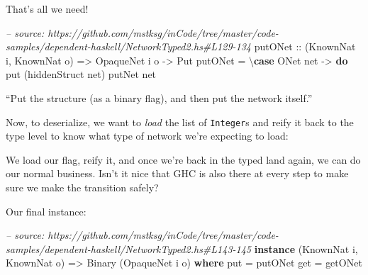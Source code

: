 \documentclass[]{article}
\newenvironment{Shaded}{}{}
\newcommand{\KeywordTok}[1]{\textcolor[rgb]{0.00,0.44,0.13}{\textbf{{#1}}}}
\newcommand{\DataTypeTok}[1]{\textcolor[rgb]{0.56,0.13,0.00}{{#1}}}
\newcommand{\CommentTok}[1]{\textcolor[rgb]{0.38,0.63,0.69}{\textit{{#1}}}}
\newcommand{\OtherTok}[1]{\textcolor[rgb]{0.00,0.44,0.13}{{#1}}}
\newcommand{\FunctionTok}[1]{\textcolor[rgb]{0.02,0.16,0.49}{{#1}}}
\newcommand{\NormalTok}[1]{{#1}}
\begin{document}
That's all we need!

\begin{Shaded}
\begin{Highlighting}[]
\CommentTok{-- source: https://github.com/mstksg/inCode/tree/master/code-samples/dependent-haskell/NetworkTyped2.hs#L129-134}
\OtherTok{putONet ::} \NormalTok{(}\DataTypeTok{KnownNat} \NormalTok{i, }\DataTypeTok{KnownNat} \NormalTok{o)}
        \OtherTok{=>} \DataTypeTok{OpaqueNet} \NormalTok{i o}
        \OtherTok{->} \DataTypeTok{Put}
\NormalTok{putONet }\FunctionTok{=} \NormalTok{\textbackslash{}}\KeywordTok{case} \DataTypeTok{ONet} \NormalTok{net }\OtherTok{->} \KeywordTok{do}
                  \NormalTok{put (hiddenStruct net)}
                  \NormalTok{putNet net}
\end{Highlighting}
\end{Shaded}

``Put the structure (as a binary flag), and then put the network itself.''

Now, to deserialize, we want to \emph{load} the list of \texttt{Integer}s and
reify it back to the type level to know what type of network we're expecting to
load:

\begin{Shaded}
\end{Shaded}

We load our flag, reify it, and once we're back in the typed land again, we can
do our normal business. Isn't it nice that GHC is also there at every step to
make sure we make the transition safely?

Our final instance:

\begin{Shaded}
\begin{Highlighting}[]
\CommentTok{-- source: https://github.com/mstksg/inCode/tree/master/code-samples/dependent-haskell/NetworkTyped2.hs#L143-145}
\KeywordTok{instance} \NormalTok{(}\DataTypeTok{KnownNat} \NormalTok{i, }\DataTypeTok{KnownNat} \NormalTok{o) }\OtherTok{=>} \DataTypeTok{Binary} \NormalTok{(}\DataTypeTok{OpaqueNet} \NormalTok{i o) }\KeywordTok{where}
    \NormalTok{put }\FunctionTok{=} \NormalTok{putONet}
    \NormalTok{get }\FunctionTok{=} \NormalTok{getONet}
\end{Highlighting}
\end{Shaded}
\end{document}

